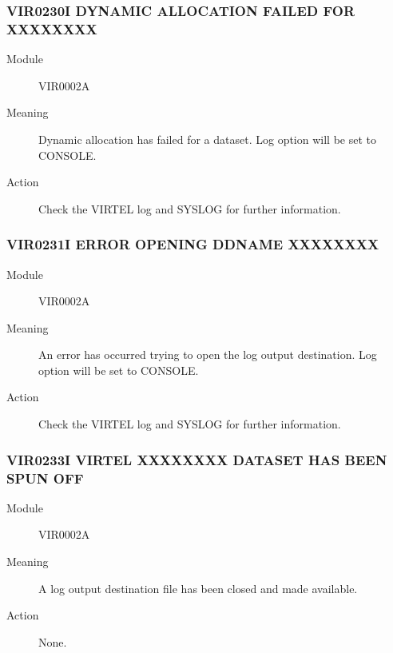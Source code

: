 \documentclass[letterpaper,10pt,english]{sphinxmanual}
\begin{document}
\subsubsection{VIR0230I DYNAMIC ALLOCATION FAILED FOR XXXXXXXX}
\label{\detokenize{messages:vir0230i-dynamic-allocation-failed-for-xxxxxxxx}}\begin{description}
\item[{Module}] \leavevmode
VIR0002A

\item[{Meaning}] \leavevmode
Dynamic allocation has failed for a dataset. Log option will be set to CONSOLE.

\item[{Action}] \leavevmode
Check the VIRTEL log and SYSLOG for further information.

\end{description}


\subsubsection{VIR0231I ERROR OPENING DDNAME XXXXXXXX}
\label{\detokenize{messages:vir0231i-error-opening-ddname-xxxxxxxx}}\begin{description}
\item[{Module}] \leavevmode
VIR0002A

\item[{Meaning}] \leavevmode
An error has occurred trying to open the log output destination. Log option will be set to CONSOLE.

\item[{Action}] \leavevmode
Check the VIRTEL log and SYSLOG for further information.

\end{description}


\subsubsection{VIR0233I VIRTEL XXXXXXXX DATASET HAS BEEN SPUN OFF}
\label{\detokenize{messages:vir0233i-virtel-xxxxxxxx-dataset-has-been-spun-off}}\begin{description}
\item[{Module}] \leavevmode
VIR0002A

\item[{Meaning}] \leavevmode
A log output destination file has been closed and made available.

\item[{Action}] \leavevmode
None.

\end{description}
\end{document}
